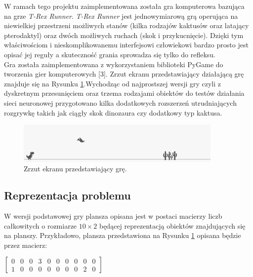 \documentclass[11pt]{article} %
\begin{document}
W ramach tego projektu zaimplementowana została gra komputerowa bazująca na grze \textit{T-Rex Runner}. \textit{T-Rex Runner} jest jednowymiarową grą operująca na niewielkiej przestrzeni możliwych stanów (kilka rodzajów kaktusów oraz latający pterodaktyl) oraz dwóch możliwych ruchach (skok i przykucnięcie). Dzięki tym właściwościom i nieskomplikowanemu interfejsowi człowiekowi bardzo prosto jest opisać jej reguły a skuteczność grania sprowadza się tylko do refleksu. \\

Gra została zaimplementowana z wykorzystaniem biblioteki PyGame do tworzenia gier komputerowych [3]. Zrzut ekranu przedstawiający działającą grę znajduje się na Rysunku \ref{fig:dinosaur_1}.Wychodząc od najprostszej wersji gry czyli z dyskretnym przesunięciem oraz trzema rodzajami obiektów do testów działania sieci neuronowej przygotowano kilka dodatkowych rozszerzeń utrudniających rozgrywkę takich jak ciągły skok dinozaura czy dodatkowy typ kaktusa. \\


\begin{figure}[h]
\centering
\includegraphics[width=10cm]{images/dinosaur_1}
\caption{Zrzut ekranu przedstawiający grę.} \label{fig:dinosaur_1}
\end{figure}




\subsection{Reprezentacja problemu}

W wersji podstawowej gry plansza opisana jest w postaci macierzy liczb całkowitych o rozmiarze $10 \times 2$ będącej reprezentacją obiektów znajdujących się na planszy. Przykładowo, plansza przedstawiona na Rysunku \ref{fig:dinosaur_1} opisana będzie przez macierz:

\begin{center}

$\begin{bmatrix} 
  0 & 0 & 0 &  3 & 0 & 0 & 0 & 0 & 0 & 0 \\
  1 & 0 & 0 &  0 & 0 & 0 & 0 & 0 & 2 & 0 
 \end{bmatrix}$
\end{center}
\end{document}
